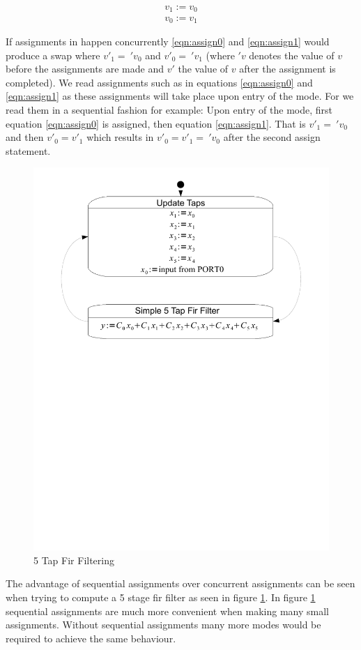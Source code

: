 \begin{align}
v_1 := v_0 \label{eqn:assign0} \\ 
v_0 := v_1 \label{eqn:assign1}
\end{align}

If assignments in  happen concurrently \ref{eqn:assign0} and \ref{eqn:assign1} would produce a swap where $v'_1 =\: 'v_0$ and $v'_0 =\: 'v_1$ (where $'v$ denotes the value of $v$ before the assignments are made and $v'$ the value of $v$ after the assignment is completed). We read assignments such as in equations \ref{eqn:assign0} and \ref{eqn:assign1} as these assignments will take place upon entry of the mode. For  we read them in a sequential fashion for example: Upon entry of the mode, first equation \ref{eqn:assign0} is assigned, then equation \ref{eqn:assign1}. That is $v'_1 =\: 'v_0$ and then $v'_0 = v'_1$ which results in $v'_0 = v'_1 =\: 'v_0$ after the second assign statement.

\begin{figure}[htp]
    \centering
    \includegraphics[trim= 10mm 145mm 10mm 10mm, clip, width=\imgmedium]{./images/state_uml2_fir.pdf}
    \caption{5 Tap Fir Filtering}
    \label{fig:state_uml2_fir}
\end{figure}

The advantage of sequential assignments over concurrent assignments can be seen when trying to compute a 5 stage fir filter as seen in figure \ref{fig:state_uml2_fir}. In figure \ref{fig:state_uml2_fir} sequential assignments are much more convenient when making many small assignments. Without sequential assignments many more modes would be required to achieve the same behaviour.




